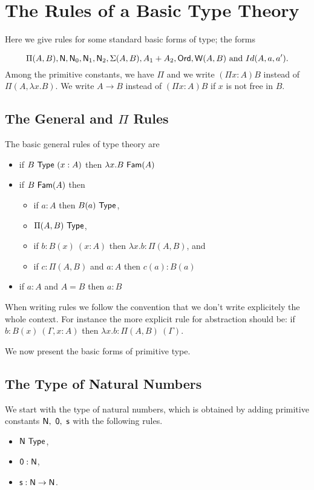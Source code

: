 \documentclass[10pt,a4paper]{article}
\newcommand{\Type}{{\sf Type}}
\newcommand{\suc}{{\sf s}}
\newcommand{\WW}{{\sf W}}
\newcommand{\NN}{{\sf N}}
\newcommand{\Ord}{{\sf Ord}}
\newcommand{\zero}{{\sf 0}}
\newcommand{\Fam}{{\sf Fam}}
\begin{document}
\section*{The Rules of a Basic Type Theory}
Here we give rules for some standard basic forms of type; the forms 

  $$\Pi(A,B),\NN,\NN_0,\NN_1,\NN_2,\Sigma(A,B),A_1+A_2,\Ord,\WW(A,B)
    \mbox{ and }Id(A,a,a').$$
%
Among the primitive constants, we have $\Pi$ and we write $(\Pi x:A)B$ instead
of $\Pi(A,\lambda x.B)$. We write $A\rightarrow B$ instead of $(\Pi x:A)B$ if
$x$ is not free in $B$.

\medskip

\subsection{The General and $\Pi$ Rules}
 The basic general rules of type theory are 
\begin{itemize}
\item if $B~\Type~(x:A)$ then $\lambda x.B~\Fam(A)$
\item if $B~\Fam(A)$ then 
\begin{itemize}
\item if $a:A$ then $B(a)~\Type$,
\item $\Pi(A,B)~\Type$,
\item if $b:B(x)~(x:A)$ then $\lambda x.b:\Pi(A,B)$, and
\item if $c:\Pi(A,B)$ and $a:A$ then $c(a):B(a)$
\end{itemize}
\item if $a:A$ and $A= B$ then $a:B$
\end{itemize}

\medskip

 When writing rules we follow the convention that we don't write explicitely the whole context.  For instance the more explicit rule for abstraction should be: if $b:B(x)~(\Gamma,x:A)$ then $\lambda x.b:\Pi(A,B)~(\Gamma)$.

\medskip

We now present the basic forms of primitive type.  

\subsection*{The Type of Natural Numbers}
We start with
the type of natural numbers, which  is obtained by adding primitive constants
$\NN,~\zero,~\suc$ with the following rules.
\begin{itemize}
\item $\NN~\Type$,
\item $\zero:\NN$,
\item $\suc:\NN\rightarrow \NN$.
\end{itemize}
\end{document}
